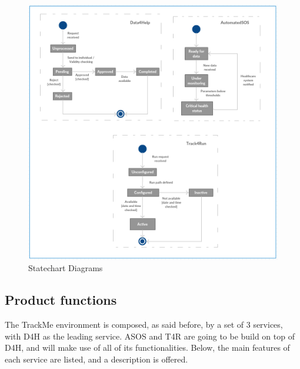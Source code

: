 \documentclass[12pt]{article}
\begin{document}
 \begin{figure}[H]
\centering
 \includegraphics[scale=0.7]{Diagrams/statechart_diagrams.png}
\caption[Statechart Diagrams]{Statechart Diagrams}
\label{fig:Statechart_diagram}
\end{figure}

\subsection{Product functions}
The TrackMe environment is composed, as said before, by a set of 3 services, with D4H as the leading service. ASOS and T4R are going to be build on top of D4H, and will make use of all of its functionalities. Below, the main features of each service are listed, and a description is offered.
\end{document}
